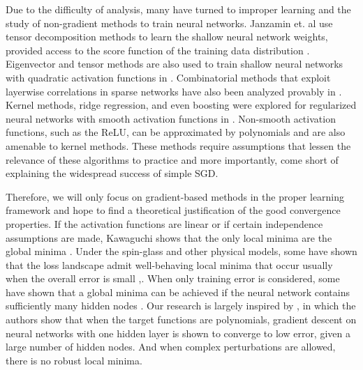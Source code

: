 Due to the difficulty of analysis, many have turned to improper learning and the study of non-gradient methods to train neural networks. Janzamin et. al use tensor decomposition methods to learn the shallow neural network weights, provided access to the score function of the training data distribution \cite{JanzaminSA15}. Eigenvector and tensor methods are also used to train shallow neural networks with quadratic activation functions in \cite{LivniSS14}. Combinatorial methods that exploit layerwise correlations in sparse networks have also been analyzed provably in \cite{AroraBGM13}. Kernel methods, ridge regression, and even boosting were explored for regularized neural networks with smooth activation functions in \cite{shalev2011learning}\cite{ZhangLWJ15}\cite{ZhangLJ15}. Non-smooth activation functions, such as the ReLU, can be approximated by polynomials and are also amenable to kernel methods\cite{GoelKKT16}. These methods require assumptions that lessen the relevance of these algorithms to practice and more importantly, come short of explaining the widespread success of simple SGD.

Therefore, we will only focus on gradient-based methods in the proper
learning framework and hope to find a theoretical justification of the
good convergence properties. If the activation functions are linear or
if certain independence assumptions are made, Kawaguchi shows that the
only local minima are the global minima \cite{Kawaguchi16a}. Under the
spin-glass and other physical models, some have shown that the loss
landscape admit well-behaving local minima that occur usually when the
overall error is small
\cite{ChoromanskaHMAL14},\cite{DauphinPGCGB14}. When only training
error is considered, some have shown that a global minima can be
achieved if the neural network contains sufficiently many hidden nodes
\cite{SoudryC16}. Our research is largely inspired by
\cite{valiant2014learning}, in which the authors show that when the
target functions are polynomials, gradient descent on neural networks
with one hidden layer is shown to converge to low error, given a large
number of hidden nodes. And when complex perturbations are allowed,
there is no robust local minima.
